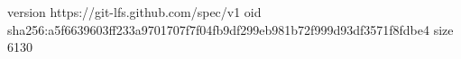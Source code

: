 version https://git-lfs.github.com/spec/v1
oid sha256:a5f6639603ff233a9701707f7f04fb9df299eb981b72f999d93df3571f8fdbe4
size 6130
